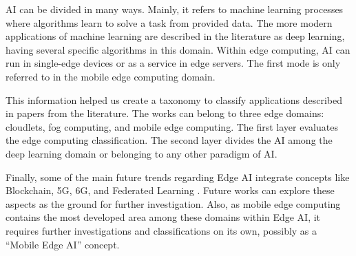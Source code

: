 AI can be divided in many ways. Mainly, it refers to machine learning processes where algorithms learn to solve a task from provided data. The more modern applications of machine learning are described in the literature as deep learning, having several specific algorithms in this domain. Within edge computing, AI can run in single-edge devices or as a service in edge servers. The first mode is only referred to in the mobile edge computing domain.

This information helped us create a taxonomy to classify applications described in papers from the literature. The works can belong to three edge domains: cloudlets, fog computing, and mobile edge computing. The first layer evaluates the edge computing classification. The second layer divides the AI among the deep learning domain or belonging to any other paradigm of AI. 

Finally, some of the main future trends regarding Edge AI integrate concepts like Blockchain, 5G, 6G, and Federated Learning \cite{sheth2020taxonomy,fantacci2020federated,wang2019edge,nguyen2021federated,al2021survey}. Future works can explore these aspects as the ground for further investigation. Also, as mobile edge computing contains the most developed area among these domains within Edge AI, it requires further investigations and classifications on its own, possibly as a ``Mobile Edge AI'' concept.

\cleardoublepage
